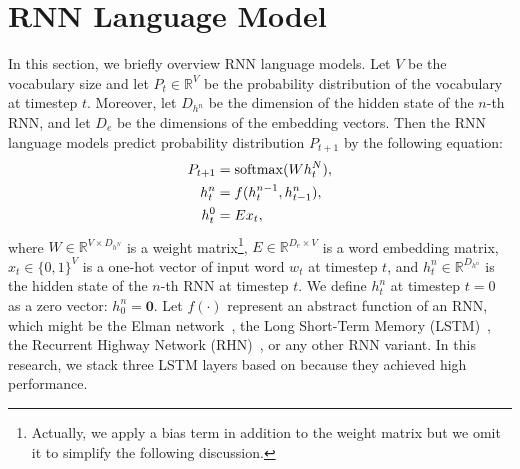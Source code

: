 \documentclass[11pt,a4paper]{article}
\begin{document}
\section{RNN Language Model}
In this section, we briefly overview RNN language models.
Let $V$ be the vocabulary size and let $P_{t} \in \mathbb{R}^{V}$ be the probability distribution of the vocabulary at timestep $t$.
Moreover, let $D_{h^n}$ be the dimension of the hidden state of the $n$-th RNN, and let $D_e$ be the dimensions of the embedding vectors.
Then the RNN language models predict probability distribution $P_{t+1}$ by the following equation:
\begin{align}
  P_{t+1} &= {\rm softmax}(W h^{N}_{t}), \label{eq:softmax} \\
  h^{n}_t &= f(h^{n-1}_{t}, h^{n}_{t-1}), \label{eq:rnn} \\
  h^{0}_t &= E x_t, \label{eq:embed}
\end{align}
where $W \in \mathbb{R}^{V \times D_{h^N}}$ is a weight matrix\footnote{Actually, we apply a bias term in addition to the weight matrix but we omit it to simplify the following discussion.}, $E \in \mathbb{R}^{D_e \times V}$ is a word embedding matrix, $x_t \in \{0,1\}^{V}$ is a one-hot vector of input word $w_t$ at timestep $t$, and $h^{n}_{t} \in \mathbb{R}^{D_{h^n}}$ is the hidden state of the $n$-th RNN at timestep $t$.
We define $h^{n}_{t}$ at timestep $t=0$ as a zero vector: $h^{n}_0 = \bm{0}$.
Let $f(\cdot)$ represent an abstract function of an RNN, which might be the Elman network~\cite{elman1990finding}, the Long Short-Term Memory (LSTM)~\cite{Hochreiter:1997:LSM:1246443.1246450}, the Recurrent Highway Network (RHN)~\cite{zilly2016recurrent}, or any other RNN variant.
In this research, we stack three LSTM layers based on  because they achieved high performance.
\end{document}
